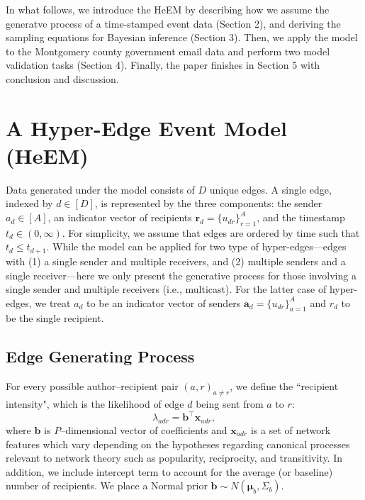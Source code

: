 \documentclass[12pt]{article}
\begin{document}
In what follows, we introduce the HeEM by describing how we assume the generatve process of a time-stamped event data (Section 2), and deriving the sampling equations for Bayesian inference (Section 3). Then, we apply the model to the Montgomery county government email data and perform two model validation tasks (Section 4). Finally, the paper finishes in Section 5 with conclusion and discussion.

\section{A Hyper-Edge Event Model (HeEM)}\label{sec:generative process}
Data generated under the model consists of $D$ unique edges. A single edge, indexed by $d \in [D]$, is represented by the three components: the sender $a_d \in [A]$, an indicator vector of recipients $\boldsymbol{r}_d = \{u_{dr} \}_{r=1}^{A}$, and the timestamp $t_d \in (0, \infty)$. For simplicity, we assume that edges are ordered by time such that $t_d \leq t_{d+1}$. While the model can be applied for two type of hyper-edges---edges with (1) a single sender and multiple receivers, and (2) multiple senders and a single receiver---here we only present the generative process for those involving a single sender and multiple receivers (i.e., multicast). For the latter case of hyper-edges, we treat $a_d$ to be an indicator vector of senders $\boldsymbol{a}_d = \{u_{dr} \}_{a=1}^{A}$ and $r_d$ to be the single recipient.
\subsection{Edge Generating Process}\label{subsec: Tie}
For every possible author--recipient pair $(a,r)_{a \neq r}$, we define the ``recipient intensity", which is the likelihood of edge $d$ being sent from $a$ to $r$:
\begin{equation}
\lambda_{adr} = {\boldsymbol{b}}^{\top}\boldsymbol{x}_{adr},
\end{equation}
where $\boldsymbol{b}$ is $P$--dimensional vector of coefficients and $\boldsymbol{x}_{adr}$ is a set of network features which vary depending on the hypotheses regarding canonical processes relevant to network theory such as popularity, reciprocity, and transitivity. In addition, we include intercept term to account for the average (or baseline) number of recipients. We place a Normal prior $\boldsymbol{b} \sim N(\boldsymbol{\mu}_b, \Sigma_b)$.
\end{document}
